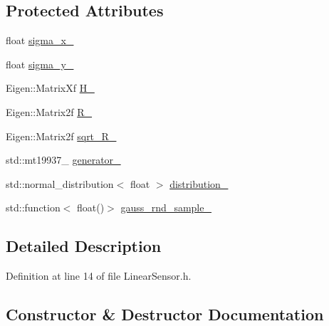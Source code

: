 \subsection*{Protected Attributes}
\begin{DoxyCompactItemize}
\item 
float \mbox{\hyperlink{classbfl_1_1LinearSensor_a3d9edc1da64faf44c02e6fb3b869bf3b}{sigma\+\_\+x\+\_\+}}
\item 
float \mbox{\hyperlink{classbfl_1_1LinearSensor_a6b017eefd02cd452f740af7ece2f0374}{sigma\+\_\+y\+\_\+}}
\item 
Eigen\+::\+Matrix\+Xf \mbox{\hyperlink{classbfl_1_1LinearSensor_ae6df14a628525b334062c104e85df7ff}{H\+\_\+}}
\item 
Eigen\+::\+Matrix2f \mbox{\hyperlink{classbfl_1_1LinearSensor_a3c8550ed25965c8e946a77602e44d87b}{R\+\_\+}}
\item 
Eigen\+::\+Matrix2f \mbox{\hyperlink{classbfl_1_1LinearSensor_ac061b358b032a56844a48cb2024fe694}{sqrt\+\_\+\+R\+\_\+}}
\item 
std\+::mt19937\+\_ \mbox{\hyperlink{classbfl_1_1LinearSensor_a564abeae2ab7fb98886f0a7952181a75}{generator\+\_\+}}
\item 
std\+::normal\+\_\+distribution$<$ float $>$ \mbox{\hyperlink{classbfl_1_1LinearSensor_a5ef72350f0591e2f95d80cf5818a5366}{distribution\+\_\+}}
\item 
std\+::function$<$ float()$>$ \mbox{\hyperlink{classbfl_1_1LinearSensor_a9c3d6ac31fc2aeade2d47cf0c9677cb1}{gauss\+\_\+rnd\+\_\+sample\+\_\+}}
\end{DoxyCompactItemize}


\subsection{Detailed Description}


Definition at line 14 of file Linear\+Sensor.\+h.



\subsection{Constructor \& Destructor Documentation}
\mbox{\label{classbfl_1_1LinearSensor_a854aed4f95acda27e216c4a2415b55bf}} 
